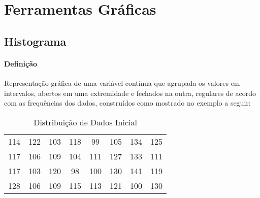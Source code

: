 \documentclass{article}
\begin{document}
    \section{Ferramentas Gráficas}
        \subsection{Histograma}
            \paragraph{Definição}Representação gráfica de uma variável contínua que agrupada os valores em intervalos, abertos em uma extremidade e fechados na outra, regulares de acordo com as frequências dos dados, construídos como mostrado no exemplo a seguir:

                \begin{table}[H]
                    \centering
                    \begin{tabular}[]{cccccccc}\hline
                        114 & 122 & 103 & 118 &  99 & 105 & 134 & 125\\
                        117 & 106 & 109 & 104 & 111 & 127 & 133 & 111\\
                        117 & 103 & 120 &  98 & 100 & 130 & 141 & 119\\
                        128 & 106 & 109 & 115 & 113 & 121 & 100 & 130\\\hline
                    \end{tabular}
                    \caption{Distribuição de Dados Inicial}\label{table:data}
                \end{table}
\end{document}
